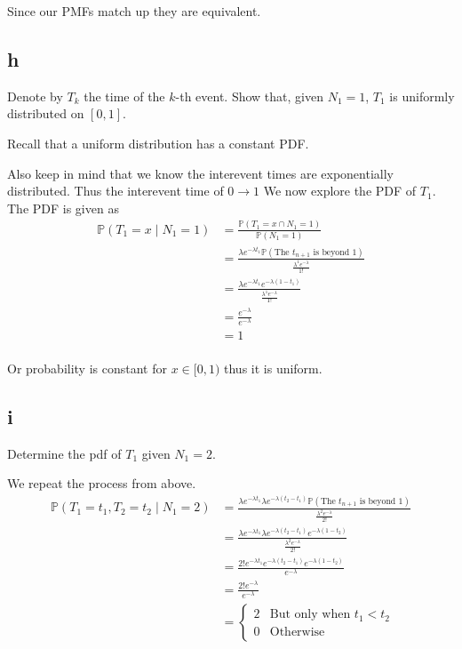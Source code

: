 \documentclass{article}
\newcommand{\prob}{\mathbb{P}}
\begin{document}
Since our PMFs match up they are equivalent.

\subsection{h}
Denote by $T_k$ the time of the $k$-th event. Show that, given $N_1 = 1$, $T_1$
is uniformly distributed on $[0, 1]$.

Recall that a uniform distribution has a constant PDF.

Also keep in mind that we know the interevent times are exponentially
distributed. Thus the interevent time of $0 \to 1$
We now explore the PDF of $T_1$. The PDF is given as 
\begin{align*}
    \prob(T_1 = x \;|\; N_1 = 1) &= \frac{\prob(T_1 = x \cap N_1 = 1)}{\prob(N_1 = 1)} \\
    &= \frac{\lambda e^{-\lambda t_1}
    \prob(\text{The } t_{n+1} \text{ is beyond 1})}
    {\frac{\lambda^1 e^{-\lambda}}{1!}} \\
    &= \frac{\lambda e^{-\lambda t_1} e^{-\lambda (1-t_1)}}
    {\frac{\lambda^1 e^{-\lambda}}{1!}} \\
    &= \frac{e^{-\lambda}}{e^{-\lambda}} \\
    &= 1 \\
\end{align*}

Or probability is constant for $x \in [0,1)$ thus it is uniform.

\subsection{i}
Determine the pdf of $T_1$ given $N_1 = 2$.

We repeat the process from above.
\begin{align*}
    \prob(T_1 = t_1, T_2 = t_2 \;|\; N_1 = 2)
    &= \frac{\lambda e^{-\lambda t_1} \lambda e^{-\lambda (t_2 - t_1)}
    \prob(\text{The } t_{n+1} \text{ is beyond 1})}
    {\frac{\lambda^2 e^{-\lambda}}{2!}} \\
    &= \frac{\lambda e^{-\lambda t_1} \lambda e^{-\lambda (t_2 - t_1)}
    e^{-\lambda (1-t_2)}}
    {\frac{\lambda^2 e^{-\lambda}}{2!}} \\
    &= \frac{2! e^{-\lambda t_1} e^{-\lambda (t_2 - t_1)} e^{-\lambda (1-t_2)}}
    {e^{-\lambda}} \\
    &= \frac{2! e^{-\lambda}}
    {e^{-\lambda}} \\
    &=
    \begin{cases}
        2 &\text{But only when $t_1 < t_2$} \\
        0 &\text{Otherwise}
    \end{cases}
\end{align*}
\end{document}
